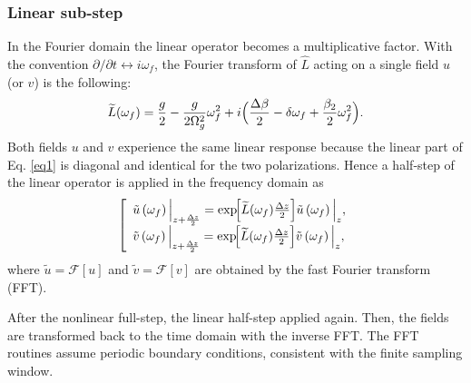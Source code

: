 \documentclass{article}
\begin{document}
            \subsubsection{Linear sub‑step}
                In the Fourier domain the linear operator becomes a multiplicative factor. With the convention $\partial/\partial t \leftrightarrow i\omega_{f}$,
                the Fourier transform of $\hat L$ acting on a single field $u$ (or $v$) is the following:
                \begin{equation}
                    \widetilde L(\omega_{f})
                    = \frac{g}{2} - \frac{g}{2\Omega_g^2}\omega_{f}^2
                    + i\Bigl(\frac{\Delta\beta}{2} - \delta\omega_{f} + \frac{\beta_2}{2}\omega_{f}^2\Bigr).
                \end{equation}
                Both fields $u$ and $v$ experience the same linear response because the linear part
                of Eq. \ref{eq1} is diagonal and identical for the two polarizations.
                Hence a half‑step of the linear operator is applied in the frequency domain as
                \begin{equation}
                    \left[
                    \begin{array}{ll}
                        \tilde u\left(\omega_f\right) \Big| _{z+\frac{\Delta z}{2}} =
                        \exp\!\Bigl[\widetilde L(\omega_f)\frac{\Delta z}{2}\Bigr] \tilde u\left(\omega_f\right) \Big| _{z},\\
                        \tilde v\left(\omega_f\right) \Big| _{z+\frac{\Delta z}{2}} =
                        \exp\!\Bigl[\widetilde L(\omega_f)\frac{\Delta z}{2}\Bigr] \tilde v\left(\omega_f\right) \Big| _{z},
                    \end{array}
                    \right.
                \end{equation}
                where $\tilde u = \mathcal{F}[u]$ and $\tilde v = \mathcal{F}[v]$ are obtained by the fast Fourier transform (FFT).

                After the nonlinear full-step, the linear half-step applied again. Then, the fields are transformed back to the time domain with the inverse FFT.
                The FFT routines assume periodic boundary conditions, consistent with the finite sampling window.
\end{document}
